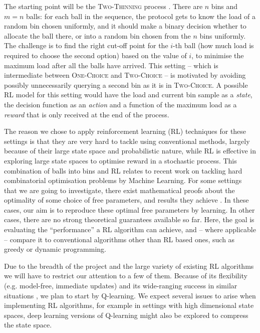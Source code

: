 The starting point will be the \textsc{Two-Thinning} process \cite{feldheim2021power}. There are $n$ bins and $m=n$ balls: for each ball in the sequence, the protocol gets to know the load of a random bin chosen uniformly, and it should make a binary decision whether to allocate the ball there, or into a random bin chosen from the $n$ bins uniformly. The challenge is to find the right cut-off point for the $i$-th ball (how much load is required to choose the second option) based on the value of $i$, to minimise the maximum load after all the balls have arrived. This setting -- which is intermediate between \textsc{One-Choice} and \textsc{Two-Choice} \cite{feldheim2021power} -- is motivated by avoiding possibly unnecessarily querying a second bin as it is in \textsc{Two-Choice}. A possible RL model for this setting would have the load and current bin sample as a \textit{state}, the decision function as an \textit{action} and a function of the maximum load as a \textit{reward} that is only received at the end of the process.


The reason we chose to apply reinforcement learning (RL) techniques for these settings is that they are very hard to tackle using conventional methods, largely because of their large state space and probabilistic nature, while RL is effective in exploring large state spaces to optimise reward in a stochastic process. This combination of balls into bins and RL relates to recent work \cite{mitzenmacher2020algorithms} on tackling hard combinatorial optimisation problems by Machine Learning. For some settings that we are going to investigate, there exist mathematical proofs about the optimality of some choice of free parameters, and results they achieve \cite{feldheim2021power}. In these cases, our aim is to reproduce these optimal free parameters by learning. In other cases, there are no strong theoretical guarantees available so far. Here, the goal is evaluating the ``performance'' a RL algorithm can achieve, and -- where applicable -- compare it to conventional algorithms other than RL based ones, such as greedy or dynamic programming.

Due to the breadth of the project and the large variety of existing RL algorithms we will have to restrict our attention to a few of them. Because of its flexibility (e.g. model-free, immediate updates) and its wide-ranging success in similar situations \cite{jang2019q}, we plan to start by Q-learning. We expect several issues to arise when implementing RL algorithms, for example in settings with high dimensional state spaces, deep learning versions of Q-learning might also be explored to compress the state space.


